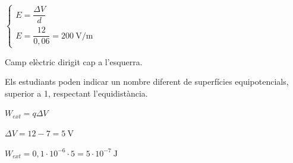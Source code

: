 \begin{solapartat}
\begin{minipage}[c]{0.5\linewidth}
 $\left\{\begin{array}{l}
E = \dfrac{\Delta V}{d}\\[2ex]
E = \dfrac{12}{0,06} = 200\ \mathrm{V/m}
\end{array}\right.$

\medskip
{} Camp elèctric dirigit cap a l'esquerra.
\end{minipage}\hfill
\begin{minipage}[c]{0.45\linewidth}
\centering{}
\end{minipage}

\medskip
Els estudiants poden indicar un nombre diferent de superfícies equipotencials, superior a 1, respectant l'equidistància.
\end{solapartat}

\begin{solapartat}
 $W_{ext} = q\Delta V$

 $\Delta V = 12 - 7 = 5\ \mathrm{V}$

 $W_{ext} = 0,1\cdot 10^{-6}\cdot 5 = 5\cdot 10^{-7}\ \mathrm{J}$
\end{solapartat}
